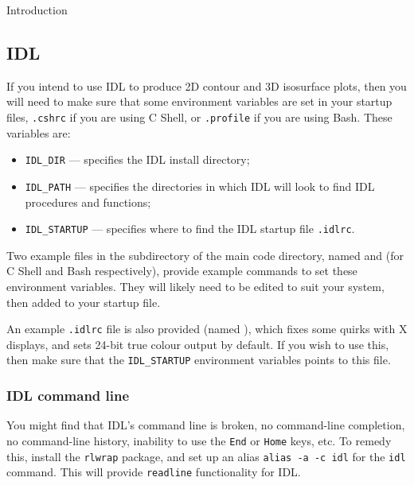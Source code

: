 \begin{chapter}{\label{cha:introduction}Introduction}
  \subsection{\label{subsec:idl_setup}IDL}
  If you intend to use IDL to produce 2D contour and 3D isosurface plots, then
  you will need to make sure that some environment variables are set in your
  startup files, \eg \verb".cshrc" if you are using C Shell, or \verb".profile"
  if you are using Bash.  These variables are:
  \begin{itemize}
    \item \verb"IDL_DIR" --- specifies the IDL install directory;
    \item \verb"IDL_PATH" --- specifies the directories in which IDL will look
      to find IDL procedures and functions;
    \item \verb"IDL_STARTUP" --- specifies where to find the IDL startup file
      \verb".idlrc".
  \end{itemize}
  Two example files in the  subdirectory of the main code
  directory, named  and  (for C Shell
  and Bash respectively), provide example commands to set these environment
  variables.  They will likely need to be edited to suit your system, then
  added to your startup file.

  An example \verb".idlrc" file is also provided (named ),
  which fixes some quirks with X displays, and sets 24-bit true colour output
  by default.  If you wish to use this, then make sure that the
  \verb"IDL_STARTUP" environment variables points to this file.

  \subsubsection{IDL command line}
  You might find that IDL's command line is broken, \ie no command-line
  completion, no command-line history, inability to use the \texttt{End} or
  \texttt{Home} keys, etc.  To remedy this, install the \texttt{rlwrap}
  package, and set up an alias \texttt{alias -a -c idl} for the \texttt{idl}
  command.  This will provide \texttt{readline} functionality for IDL.


\end{chapter}
